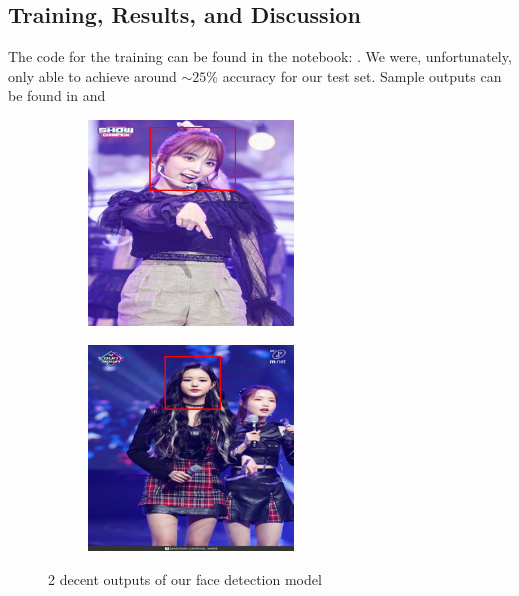\subsection{Training, Results, and Discussion}

The code for the training can be found in the notebook: \href{https://github.com/nicholaspun/IZ-Net/blob/master/notebooks/FaceDetection.ipynb}{}.
We were, unfortunately, only able to achieve around $\sim25\%$ accuracy for our test set.
Sample outputs can be found in  and 

\begin{figure}[htbp]
    \centering
    \begin{subfigure}{0.495\textwidth}
        \centering
        \includegraphics[width=0.6\textwidth]{images/faceDetec/training/result-1.png}
    \end{subfigure}
    \hfill
    \begin{subfigure}{0.495\textwidth}
        \centering
        \includegraphics[width=0.6\textwidth]{images/faceDetec/training/result-2.png}
    \end{subfigure}
    \caption{
        2 decent outputs of our face detection model
    }
    \label{Figure:Face-Detection:training:outputs-good}
\end{figure}

